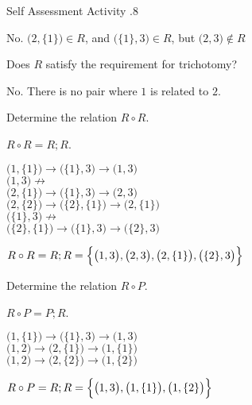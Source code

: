 \documentclass[\main/notes.tex]{subfiles}
\begin{document}
\begin{exercise}{Self Assessment Activity \thechapter.8}
\begin{questions}
\begin{questions}
									\begin{answer}
										No. $\bigl(2, \{1\}\bigr) \in R$, and $\bigl(\{1\}, 3\bigr) \in R$, but $\bigl(2, 3\bigr) \notin R$
									\end{answer}
								\item Does $R$ satisfy the requirement for trichotomy?\\
									\begin{answer}
										No. There is no pair where $1$ is related to $2$.
									\end{answer}
								\item Determine the relation $R \circ R$.\\
									\begin{answer}
										$R \circ R = R; R$.
										\begin{indentparagraph}
											$\bigl(1, \{1\}\bigr) \rightarrow \bigl(\{1\}, 3\bigr) \rightarrow \bigl(1, 3\bigr)$\\
											$\bigl(1, 3\bigr) \not \rightarrow$\\
											$\bigl(2, \{1\}\bigr) \rightarrow \bigl(\{1\}, 3\bigr) \rightarrow \bigl(2, 3\bigr)$\\
											$\bigl(2, \{2\}\bigr) \rightarrow \bigl(\{2\}, \{1\}\bigr) \rightarrow \bigl(2, \{1\}\bigr)$\\
											$\bigl(\{1\}, 3\bigr) \not \rightarrow$\\
											$\bigl(\{2\}, \{1\}\bigr) \rightarrow \bigl(\{1\}, 3\bigr) \rightarrow \bigl(\{2\}, 3\bigr)$
										\end{indentparagraph}
										$R \circ R = R; R = \Bigl\{\bigl(1, 3\bigr), \bigl(2, 3\bigr), \bigl(2, \{1\}\bigr), \bigl(\{2\}, 3\bigr)\Bigr\}$
									\end{answer}
								\item Determine the relation $R \circ P$.
									\begin{answer}
										$R \circ P = P;R$.
										\begin{indentparagraph}
											$\bigl(1, \{1\}\bigr) \rightarrow \bigl(\{1\}, 3\bigr) \rightarrow \bigl(1, 3\bigr)$\\
											$\bigl(1, 2\bigr) \rightarrow \bigl(2, \{1\}\bigr) \rightarrow \bigl(1, \{1\}\bigr)$\\
											$\bigl(1, 2\bigr) \rightarrow \bigl(2, \{2\}\bigr) \rightarrow \bigl(1, \{2\}\bigr)$
										\end{indentparagraph}
										$R \circ P = R;R = \Bigl\{\bigl(1, 3\bigr), \bigl(1, \{1\}\bigr), \bigl(1, \{2\}\bigr)\Bigr\}$

\end{answer}
\end{questions}
\end{questions}
\end{exercise}
\end{document}
